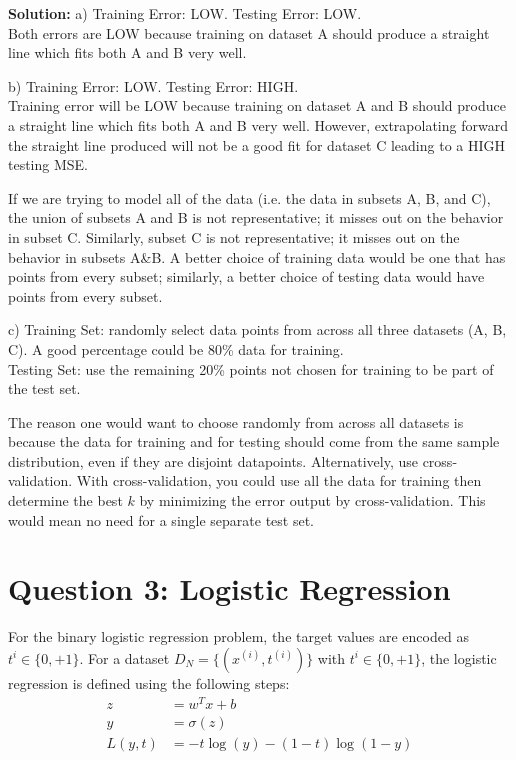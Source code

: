 \documentclass[12pt]{article}
\begin{document}
	\begin{framed}
		\textbf{Solution: }
		a) Training Error: LOW. Testing Error: LOW.\\
		Both errors are LOW because training on dataset A should produce a straight line which fits both A and B very well. 
		
		b) Training Error: LOW. Testing Error: HIGH. \\
		Training error will be LOW because training on dataset A and B should produce a straight line which fits both A and B very well. However, extrapolating forward the straight line produced will not be a good fit for dataset C leading to a HIGH testing MSE.
		
	 	If we are trying to model all of the data (i.e. the data in subsets A, B, and C), the union of subsets A and B is not representative; it misses out on the behavior in subset C. Similarly, subset C is not representative; it misses out on the behavior in subsets A\&B. A better choice of training data would be one that has points from every subset; similarly, a better choice of testing data would have points from every subset.
		
		c) Training Set: randomly select data points from across all three datasets (A, B, C). A good percentage could be 80\% data for training.\\
		Testing Set: use the remaining 20\% points not chosen for training to be part of the test set.
		
		The reason one would want to choose randomly from across all datasets is because the data for training and for testing should come from the same sample distribution, even if they are disjoint datapoints. Alternatively, use cross-validation. With cross-validation, you could use all the data for training then determine the best $k$ by minimizing the error output by cross-validation. This would mean no need for a single separate test set.
	\end{framed}

	\section*{Question 3: Logistic Regression}
	For the binary logistic regression problem, the target values are encoded as $t^i \in \{0,+1\}$.
	For a dataset $D_N = \{(x^{(i)}, t^{(i)})\}$ with $t^i \in \{0,+1\}$, the logistic regression is defined using the following steps:
	\begin{align}
		z &= w^Tx + b \\
		y &= \sigma(z) \\
		L(y,t) &= -t\log(y) - (1-t) \log (1-y)
	\end{align}
	
\end{document}
